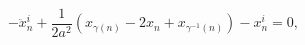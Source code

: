 \begin{equation}\label{bos-eom}
  -\ddot{x}^i_n+\frac{1}{2a^2}(x_{\gamma(n)}-2x_n+
  x_{\gamma^{-1}(n)})-x^i_n=0,
\end{equation}

